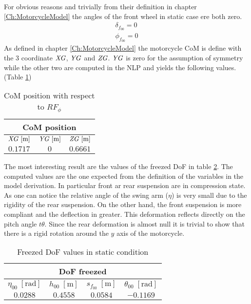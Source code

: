 For obvious reasons and trivially from their definition in chapter \ref{Ch:MotorcycleModel} the angles of the front wheel in static case ere both zero.
%
\begin{equation*}
    \begin{array}{l}
        \delta_{f_{00}}=0\\
        \phi_{f_{00}}=0
    \end{array}
\end{equation*}
%
As defined in chapter \ref{Ch:MotorcycleModel} the motorcycle CoM is define with the 3 coordinate ${\it XG}$, ${\it YG}$ and ${\it ZG}$. ${\it YG}$ is zero for the assumption of symmetry while the other two are computed in the NLP and yields the following values.(Table \ref{tab:CoMPosition})

%
\begin{table}[h!]
    \centering
    \begin{tabular}{@{}ccc@{}}
    \toprule
    \multicolumn{3}{c}{\textbf{CoM position}} \\ \midrule
    ${\it XG} \; [\si{\metre}]$ & ${\it YG} \; [\si{\metre}]$ & ${\it ZG} \; [\si{\metre}]$ \\
    $0.1717$              &  $0$                  & $0.6661$              \\ \bottomrule
    \end{tabular}
    \caption{CoM position with respect to $RF_\phi$}
    \label{tab:CoMPosition}
\end{table}
%

The most interesting result are the values of the freezed DoF in table \ref{tab:DoFFreezed}. The computed values are the one expected from the definition of the variables in the model derivation. In particular front ar rear suspension are in compression state. As one can notice the relative angle of the swing arm ($\eta$) is very small due to the rigidity of the rear suspension. On the other hand, the front suspension is more compliant and the deflection in greater. This deformation reflects directly on the pitch angle $t\theta$. Since the rear deformation is almost null it is trivial to show that there is a rigid rotation around the $y$ axis of the motorcycle.

%
\begin{table}[h!]
    \centering
    \begin{tabular}{@{}cccc@{}}
    \toprule
    \multicolumn{4}{c}{\textbf{DoF freezed}} \\ \midrule
    $\eta_{00} \; [\si{\radian}]$ & $h_{00} \; [\si{\metre}]$ & $s_{f_{00}} \; [\si{\metre}]$ &  $\theta_{00} \; [\si{\radian}]$ \\
    $0.0288  $ & $0.4558  $ & $0.0584  $ & $-0.1169 $ \\ \bottomrule
    \end{tabular}
    \caption{Freezed DoF values in static condition}
    \label{tab:DoFFreezed}
\end{table}
%

